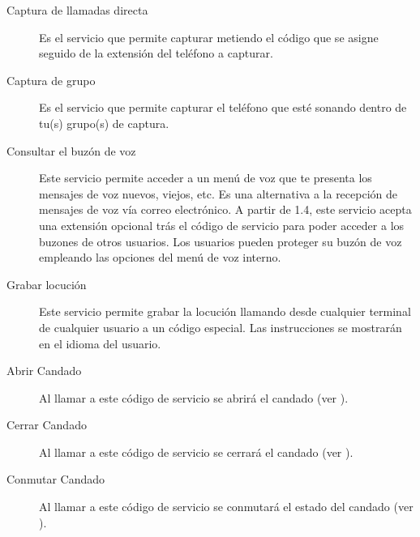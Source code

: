 \documentclass[letterpaper,10pt,spanish]{sphinxmanual}
\begin{document}
\noindent{}
\begin{description}
\item[{Captura de llamadas directa}] \leavevmode{}\label{pbx_features/services:term-direct-pickup}
Es el servicio que permite capturar metiendo el código que se asigne seguido de la extensión del teléfono a capturar.

\item[{Captura de grupo}] \leavevmode{}\label{pbx_features/services:term-group-pickup}
Es el servicio que permite capturar el teléfono que esté sonando dentro de tu(s) grupo(s) de captura.

\item[{Consultar el buzón de voz}] \leavevmode{}\label{pbx_features/services:term-check-voicemail}
Este servicio permite acceder a un menú de voz que te presenta los mensajes de voz nuevos, viejos, etc. Es una alternativa a la recepción de mensajes de voz vía correo electrónico. A partir de 1.4, este servicio acepta una extensión opcional trás el código de servicio para poder acceder a los buzones de otros usuarios. Los usuarios pueden proteger su buzón de voz empleando las opciones del menú de voz interno.

\item[{Grabar locución}] \leavevmode{}\label{pbx_features/services:term-record-locution}
Este servicio permite grabar la locución llamando desde cualquier terminal de cualquier usuario a un código especial. Las instrucciones se mostrarán en el idioma del usuario.

\item[{Abrir Candado}] \leavevmode{}\label{pbx_features/services:term-open-lock}
Al llamar a este código de servicio se abrirá el candado (ver {\hyperref[pbx_features/route_locks:route\string-locks]{}}).

\item[{Cerrar Candado}] \leavevmode{}\label{pbx_features/services:term-close-lock}
Al llamar a este código de servicio se cerrará el candado (ver {\hyperref[pbx_features/route_locks:route\string-locks]{}}).

\item[{Conmutar Candado}] \leavevmode{}\label{pbx_features/services:term-toggle-lock}
Al llamar a este código de servicio se conmutará el estado del candado (ver {\hyperref[pbx_features/route_locks:route\string-locks]{}}).

\end{description}
\end{document}

